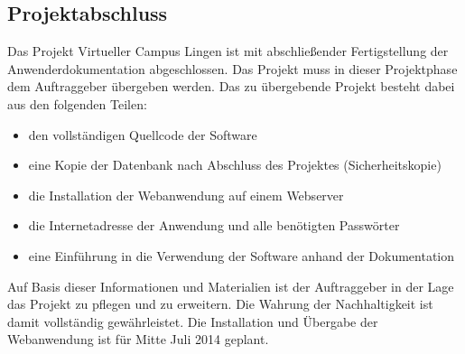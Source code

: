 \subsection{Projektabschluss}
\label{sec:Projektabschluss}

Das Projekt Virtueller Campus Lingen ist mit abschließender Fertigstellung der Anwenderdokumentation
abgeschlossen. Das Projekt muss in dieser Projektphase dem Auftraggeber übergeben werden.
Das zu übergebende Projekt besteht dabei aus den folgenden Teilen:

\begin{itemize}
  \item den vollständigen Quellcode der Software
  \item eine Kopie der Datenbank nach Abschluss des Projektes (Sicherheitskopie)
  \item die Installation der Webanwendung auf einem Webserver
  \item die Internetadresse der Anwendung und alle benötigten Passwörter
  \item eine Einführung in die Verwendung der Software anhand der Dokumentation
\end{itemize}

Auf Basis dieser Informationen und Materialien ist der Auftraggeber in der Lage das Projekt zu pflegen und zu erweitern. Die Wahrung der Nachhaltigkeit ist damit vollständig gewährleistet. Die Installation und Übergabe der Webanwendung ist für Mitte Juli 2014 geplant.